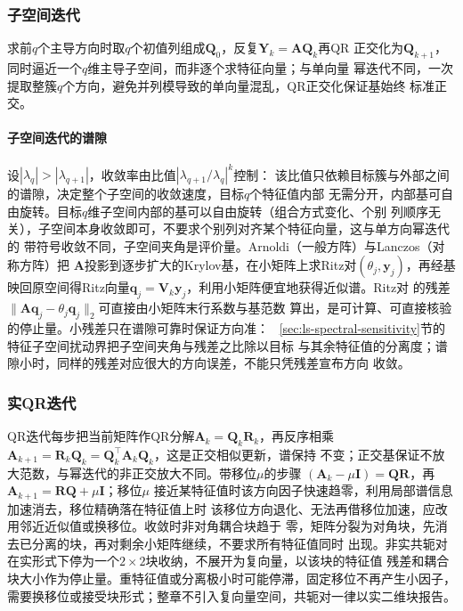 \subsubsection{子空间迭代}

求前$q$个主导方向时取$q$个初值列组成$\bm Q_0$，反复$\bm Y_k=\bm A\bm Q_k$再QR
正交化为$\bm Q_{k+1}$，同时逼近一个$q$维主导子空间，而非逐个求特征向量；与单向量
幂迭代不同，一次提取整簇$q$个方向，避免并列模导致的单向量混乱，QR正交化保证基始终
标准正交。

\paragraph{子空间迭代的谱隙}

设$|\lambda_q|>|\lambda_{q+1}|$，收敛率由比值$|\lambda_{q+1}/\lambda_q|^k$控制：
该比值只依赖目标簇与外部之间的谱隙，决定整个子空间的收敛速度，目标$q$个特征值内部
无需分开，内部基可自由旋转。目标$q$维子空间内部的基可以自由旋转（组合方式变化、个别
列顺序无关），子空间本身收敛即可，不要求个别列对齐某个特征向量，这与单方向幂迭代的
带符号收敛不同，子空间夹角是评价量。Arnoldi（一般方阵）与Lanczos（对称方阵）把
$\bm A$投影到逐步扩大的Krylov基，在小矩阵上求Ritz对$(\theta_j,\bm y_j)$，再经基
映回原空间得Ritz向量$\bm q_j=\bm V_k\bm y_j$，利用小矩阵便宜地获得近似谱。Ritz对
的残差$\lVert\bm A\bm q_j-\theta_j\bm q_j\rVert_2$可直接由小矩阵末行系数与基范数
算出，是可计算、可直接核验的停止量。小残差只在谱隙可靠时保证方向准：
~\ref{sec:ls-spectral-sensitivity}节的特征子空间扰动界把子空间夹角与残差之比除以目标
与其余特征值的分离度；谱隙小时，同样的残差对应很大的方向误差，不能只凭残差宣布方向
收敛。

\subsubsection{实QR迭代}

QR迭代每步把当前矩阵作QR分解$\bm A_k=\bm Q_k\bm R_k$，再反序相乘
$\bm A_{k+1}=\bm R_k\bm Q_k=\bm Q_k^{\top}\bm A_k\bm Q_k$，这是正交相似更新，谱保持
不变；正交基保证不放大范数，与幂迭代的非正交放大不同。带移位$\mu$的步骤
$(\bm A_k-\mu\bm I)=\bm Q\bm R$，再$\bm A_{k+1}=\bm R\bm Q+\mu\bm I$；移位$\mu$
接近某特征值时该方向因子快速趋零，利用局部谱信息加速消去，移位精确落在特征值上时
该移位方向退化、无法再借移位加速，应改用邻近近似值或换移位。收敛时非对角耦合块趋于
零，矩阵分裂为对角块，先消去已分离的块，再对剩余小矩阵继续，不要求所有特征值同时
出现。非实共轭对在实形式下停为一个$2\times2$块收纳，不展开为复向量，以该块的特征值
残差和耦合块大小作为停止量。重特征值或分离极小时可能停滞，固定移位不再产生小因子，
需要换移位或接受块形式；整章不引入复向量空间，共轭对一律以实二维块报告。

